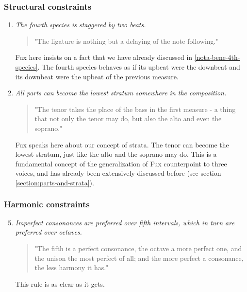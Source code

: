 \subsubsection{Structural constraints}
\begin{enumerate}[wide, label=\bfseries 4.S\arabic*]
\setcounter{enumi}{0}
    \item \textit{The fourth species is staggered by two beats.} \label{rule:delaying}    
    \begin{quotation}
        "The ligature is nothing but a delaying of the note following."
        \textcite[p.95]{GaPEng}
    \end{quotation}
    Fux here insists on a fact that we have already discussed in \ref{nota-bene-4th-species}. The fourth species behaves as if its upbeat were the downbeat and its downbeat were the upbeat of the previous measure.

    \item \textit{All parts can become the lowest stratum somewhere in the composition.} \label{rule:tenor-might-take-place-of-bass}    
    \begin{quotation}
        "The tenor takes the place of the bass in the first measure - a thing that not only the tenor may do, but also the alto and even the soprano."
        \textcite[p.100]{GaPEng}
    \end{quotation}
    Fux speaks here about our concept of strata. The tenor can become the lowest stratum, just like the alto and the soprano may do. This is a fundamental concept of the generalization of Fux counterpoint to three voices, and has already been extensively discussed before (see section \ref{section:parts-and-strata}).
\end{enumerate}

\subsubsection{Harmonic constraints}
\begin{enumerate}[wide, label=\bfseries 4.H\arabic*]
    \setcounter{enumi}{4}
    \item \textit{Imperfect consonances are preferred over fifth intervals, which in turn are preferred over octaves.} \label{rule:prefer-fifths-over-octaves}    
    \begin{quotation}
        "The fifth is a perfect consonance, the octave a more perfect one, and the unison the most perfect of all; and the more perfect a consonance, the less harmony it has."
        \textcite[p.97]{GaPEng}
    \end{quotation}
    This rule is as clear as it gets.
\end{enumerate}

